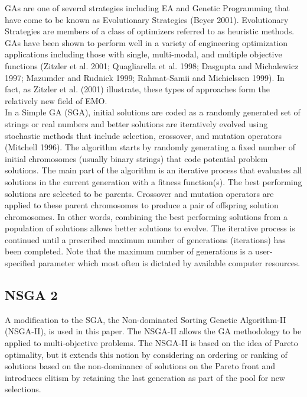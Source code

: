 \documentclass{sig-alternate}
\begin{document}
GAs are one of several strategies including EA and Genetic Programming that have come to be known as Evolutionary Strategies (Beyer 2001). Evolutionary Strategies are members of a class of optimizers referred to as heuristic methods. GAs have been shown to perform well in a variety of engineering optimization applications including those with single, multi-modal, and multiple objective functions (Zitzler et al. 2001; Quagliarella et al. 1998; Dasgupta and Michalewicz 1997; Mazumder and Rudnick 1999; Rahmat-Samii and Michielssen 1999). In fact, as Zitzler et al. (2001) illustrate, these types of approaches form the relatively new field of EMO.\\
In a Simple GA (SGA), initial solutions are coded as a randomly generated set of strings or real numbers and better solutions are iteratively evolved using stochastic methods that include selection, crossover, and mutation operators (Mitchell 1996). The algorithm starts by randomly generating a fixed number of initial chromosomes (usually binary strings) that code potential problem solutions. The main part of the algorithm is an iterative process that evaluates all solutions in the current generation with a fitness function(s). The best performing solutions are selected to be parents. Crossover and mutation operators are applied to these parent chromosomes to produce a pair of offspring solution chromosomes. In other words, combining the best performing solutions from a population of solutions allows better solutions to evolve. The iterative process is continued until a prescribed maximum number of generations (iterations) has been completed. Note that the maximum number of generations is a user-specified parameter which most often is dictated by available computer resources.\\
\subsection{NSGA 2}
A modification to the SGA, the Non-dominated Sorting Genetic Algorithm-II (NSGA-II), is used in this paper. The NSGA-II allows the GA methodology to be applied to multi-objective problems. The NSGA-II is based on the idea of Pareto optimality, but it extends this notion by considering an ordering or ranking of solutions based on the non-dominance of solutions on the Pareto front and introduces elitism by retaining the last generation as part of the pool for new selections. \\[.25cm]
\end{document}
